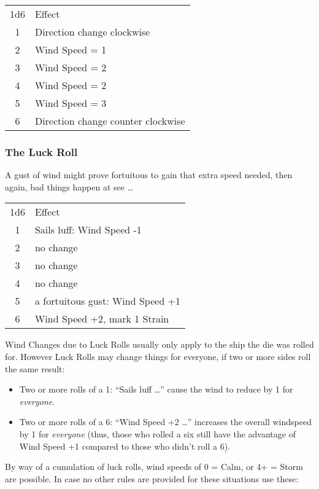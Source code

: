 \documentclass[11pt]{wbzine}
\begin{document}
\begin{multicols}{2}
\begin{tabularx}{\columnwidth}{cZ}
1d6 & Effect \\
1 & Direction change clockwise \\
2 & Wind Speed = 1 \\
3 & Wind Speed = 2 \\
4 & Wind Speed = 2 \\
5 & Wind Speed = 3 \\
6 & Direction change counter clockwise \\
\end{tabularx}

\subsubsection{The Luck Roll}

A gust of wind might prove fortuitous to gain that extra speed needed,
then again, bad things happen at see \ldots{}

\begin{tabularx}{\columnwidth}{cZ}
1d6 & Effect \\
1 & Sails luff: Wind Speed -1 \\
2 & no change \\
3 & no change \\
4 & no change \\
5 & a fortuitous gust: Wind Speed +1 \\
6 & Wind Speed +2, mark 1 Strain \\
\end{tabularx}

Wind Changes due to Luck Rolls usually only apply to the ship the die
was rolled for. However Luck Rolls may change things for everyone, if
two or more sides roll the same result:

\begin{itemize}
\item
  Two or more rolls of a 1: ``Sails luff \ldots{}'' cause the wind to
  reduce by 1 for \emph{everyone}.
\item
  Two or more rolls of a 6: ``Wind Speed +2 \ldots{}'' increases the
  overall windspeed by 1 for \emph{everyone} (thus, those who rolled a
  six still have the advantage of Wind Speed +1 compared to those who
  didn't roll a 6).
\end{itemize}

By way of a cumulation of luck rolls, wind speeds of 0 = Calm, or 4+ =
Storm are possible. In case no other rules are provided for these
situations use these:


\end{multicols}
\end{document}
